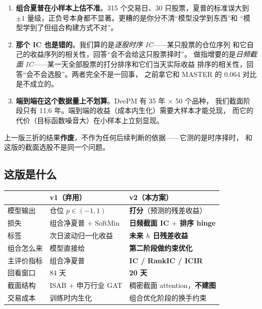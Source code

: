 \documentclass[11pt, a4paper]{ctexart}
\begin{document}
\begin{enumerate}
  \item \textbf{组合夏普在小样本上估不准}。315 个交易日、30 只股票，夏普的标准误大到
        $\pm 1$ 量级，正负号本身都不显著。更糟的是你分不清“模型没学到东西”和
        “模型学到了但组合构建方式不对”。
  \item \textbf{那个 IC 也是错的}。我们算的是\emph{逐股时序 IC}——某只股票的仓位序列
        和它自己的收益序列的相关性，回答“会不会给这只股票择时”。
        做指增要的是\emph{日频截面 IC}——某一天全部股票的打分排序和它们当天实际收益
        排序的相关性，回答“会不会选股”。两者完全不是一回事，
        之前拿它和 MASTER 的 0.064 对比是不成立的。
  \item \textbf{端到端在这个数据量上不划算}。DeePM 有 35 年 $\times$ 50 个品种，
        我们截面阶段只有 11.6 年。端到端的收益（成本内生化）需要大样本才能兑现，
        而它的代价（目标函数噪音大）在小样本上立刻显现。
\end{enumerate}

\begin{warnbox}
上一版三折的结果\textbf{作废}，不作为任何后续判断的依据——它测的是时序择时，
和这版的截面选股不是同一个问题。
\end{warnbox}

\subsection{这版是什么}

\begin{center}
\small
\begin{tabular}{lll}
\toprule
 & v1（弃用） & v2（本方案） \\
\midrule
模型输出 & 仓位 $p\in(-1,1)$ & \textbf{打分}（预测的残差收益） \\
损失 & 组合净夏普 $+$ SoftMin & \textbf{日频截面 IC $+$ 排序 hinge} \\
标签 & 次日波动归一化收益 & \textbf{未来 $h$ 日残差收益} \\
组合怎么来 & 模型直接给 & \textbf{第二阶段做约束优化} \\
主评价指标 & 组合净夏普 & \textbf{IC / RankIC / ICIR} \\
回看窗口 & 84 天 & \textbf{20 天} \\
截面结构 & ISAB $+$ 申万行业 GAT & 稠密截面 attention，\textbf{不建图} \\
交易成本 & 训练时内生化 & 组合优化阶段的换手约束 \\
\bottomrule
\end{tabular}
\end{center}
\end{document}
